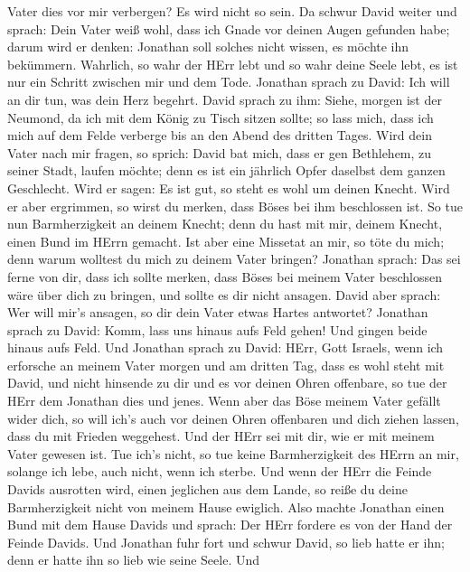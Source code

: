 Vater dies vor mir verbergen? Es wird nicht so sein.  Da
schwur David weiter und sprach: Dein Vater weiß wohl, dass ich Gnade vor
deinen Augen gefunden habe; darum wird er denken: Jonathan soll solches
nicht wissen, es möchte ihn bekümmern. Wahrlich, so wahr der HErr lebt
und so wahr deine Seele lebt, es ist nur ein Schritt zwischen mir und
dem Tode.  Jonathan sprach zu David: Ich will an dir tun,
was dein Herz begehrt.  David sprach zu ihm: Siehe, morgen
ist der Neumond, da ich mit dem König zu Tisch sitzen sollte; so lass
mich, dass ich mich auf dem Felde verberge bis an den Abend des dritten
Tages.  Wird dein Vater nach mir fragen, so sprich: David
bat mich, dass er gen Bethlehem, zu seiner Stadt, laufen möchte; denn es
ist ein jährlich Opfer daselbst dem ganzen Geschlecht.  Wird
er sagen: Es ist gut, so steht es wohl um deinen Knecht. Wird er aber
ergrimmen, so wirst du merken, dass Böses bei ihm beschlossen ist.
 So tue nun Barmherzigkeit an deinem Knecht; denn du hast
mit mir, deinem Knecht, einen Bund im HErrn gemacht. Ist aber eine
Missetat an mir, so töte du mich; denn warum wolltest du mich zu deinem
Vater bringen?  Jonathan sprach: Das sei ferne von dir, dass
ich sollte merken, dass Böses bei meinem Vater beschlossen wäre über
dich zu bringen, und sollte es dir nicht ansagen.  David
aber sprach: Wer will mir's ansagen, so dir dein Vater etwas Hartes
antwortet?  Jonathan sprach zu David: Komm, lass uns hinaus
aufs Feld gehen! Und gingen beide hinaus aufs Feld.  Und
Jonathan sprach zu David: HErr, Gott Israels, wenn ich erforsche an
meinem Vater morgen und am dritten Tag, dass es wohl steht mit David,
und nicht hinsende zu dir und es vor deinen Ohren offenbare,
 so tue der HErr dem Jonathan dies und jenes. Wenn aber das
Böse meinem Vater gefällt wider dich, so will ich's auch vor deinen
Ohren offenbaren und dich ziehen lassen, dass du mit Frieden weggehest.
Und der HErr sei mit dir, wie er mit meinem Vater gewesen ist.
 Tue ich's nicht, so tue keine Barmherzigkeit des HErrn an
mir, solange ich lebe, auch nicht, wenn ich sterbe.  Und
wenn der HErr die Feinde Davids ausrotten wird, einen jeglichen aus dem
Lande, so reiße du deine Barmherzigkeit nicht von meinem Hause ewiglich.
 Also machte Jonathan einen Bund mit dem Hause Davids und
sprach: Der HErr fordere es von der Hand der Feinde Davids.
 Und Jonathan fuhr fort und schwur David, so lieb hatte er
ihn; denn er hatte ihn so lieb wie seine Seele.  Und
